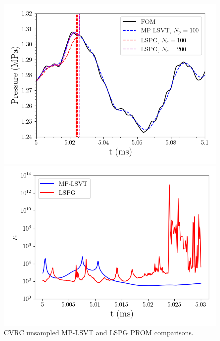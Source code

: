 \begin{figure}
	\begin{minipage}{0.49\linewidth}
		\includegraphics[width=0.99\linewidth]{Chapters/HPROMResults/Images/cvrc/unsampled/pressure_probe_unsampled_lspg.png}
	\end{minipage}
	\begin{minipage}{0.49\linewidth}
		\includegraphics[width=0.99\linewidth]{Chapters/HPROMResults/Images/cvrc/unsampled/condition_number.png}
	\end{minipage}
	\caption{CVRC unsampled MP-LSVT and LSPG PROM comparisons.}
\end{figure}

